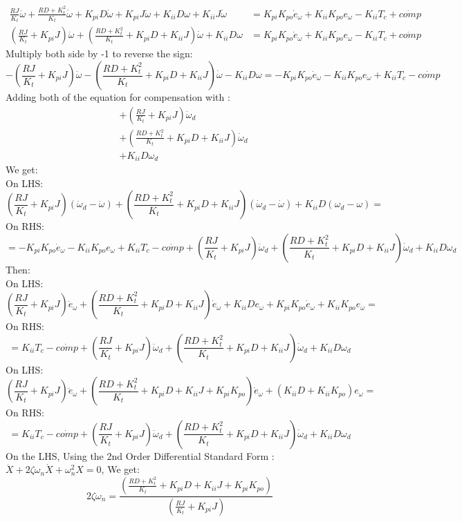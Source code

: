 	\[
	\begin{split}
		\frac{RJ}{K_t} \ddot{\omega} + \frac{RD + K_t^2}{K_t} \dot{\omega} + K_{pi}D\dot{\omega} + K_{pi}J \ddot{\omega} + K_{ii}D\omega + K_{ii}J\dot{\omega} &= K_{pi}K_{po}\dot{e}_\omega + K_{ii}K_{po}e_\omega - K_{ii}T_c  + \dot{comp} \\
		(\frac{RJ}{K_t} + K_{pi}J ) \ddot{\omega} + (\frac{RD + K_t^2}{K_t}+ K_{pi}D + K_{ii}J) \dot{\omega} + K_{ii}D\omega &=K_{pi}K_{po}\dot{e}_\omega + K_{ii}K_{po}e_\omega - K_{ii}T_c  + \dot{comp}
	\end{split}
	\]
	Multiply both side by -1 to reverse the sign:
	\[
	-(\frac{RJ}{K_t} + K_{pi}J ) \ddot{\omega} - (\frac{RD + K_t^2}{K_t}+ K_{pi}D + K_{ii}J) \dot{\omega} - K_{ii}D\omega = -K_{pi}K_{po}\dot{e}_\omega - K_{ii}K_{po}e_\omega + K_{ii}T_c  - \dot{comp}
	\]
	Adding both of the equation for compensation with :
	\[
	\begin{split}
	&+(\frac{RJ}{K_t} + K_{pi}J ) \ddot{\omega}_d \\
	&+(\frac{RD + K_t^2}{K_t}+ K_{pi}D + K_{ii}J) \dot{\omega}_d \\
	&+K_{ii}D\omega_d
	\end{split}
	\]
	We get:\\
	On LHS:
	\[
	(\frac{RJ}{K_t} + K_{pi}J ) (\ddot{\omega}_d - \ddot{\omega}) + (\frac{RD + K_t^2}{K_t}+ K_{pi}D + K_{ii}J) (\dot{\omega}_d - \dot{\omega})  + K_{ii}D(\omega_d - \omega) = 
	\]
	On RHS:
	\[
	=-K_{pi}K_{po}\dot{e}_\omega - K_{ii}K_{po}e_\omega + K_{ii}T_c  - \dot{comp} +(\frac{RJ}{K_t} + K_{pi}J ) \ddot{\omega}_d + (\frac{RD + K_t^2}{K_t}+ K_{pi}D + K_{ii}J) \dot{\omega}_d+K_{ii}D\omega_d
	\]
	Then:\\
	On LHS:
	\[
	(\frac{RJ}{K_t} + K_{pi}J ) \ddot{e}_\omega + (\frac{RD + K_t^2}{K_t}+ K_{pi}D + K_{ii}J) \dot{e}_\omega  + K_{ii}D e_\omega +K_{pi}K_{po}\dot{e}_\omega + K_{ii}K_{po}e_\omega= 
	\]
	On RHS:
	\[
	= K_{ii}T_c  - \dot{comp} +(\frac{RJ}{K_t} + K_{pi}J ) \ddot{\omega}_d + (\frac{RD + K_t^2}{K_t}+ K_{pi}D + K_{ii}J) \dot{\omega}_d+K_{ii}D\omega_d
	\]
	On LHS:
	\[
	(\frac{RJ}{K_t} + K_{pi}J ) \ddot{e}_\omega + (\frac{RD + K_t^2}{K_t}+ K_{pi}D + K_{ii}J+K_{pi}K_{po}) \dot{e}_\omega + (K_{ii}D+K_{ii}K_{po}) e_\omega = 
	\]
	On RHS:
	\[
	= K_{ii}T_c  - \dot{comp} +(\frac{RJ}{K_t} + K_{pi}J ) \ddot{\omega}_d + (\frac{RD + K_t^2}{K_t}+ K_{pi}D + K_{ii}J) \dot{\omega}_d+K_{ii}D\omega_d
	\]
	On the LHS, Using the 2nd Order Differential Standard Form : $ \ddot{X} + 2\zeta\omega_n\dot{X} + \omega_n^2 X=0 $, We get:
	\[
	2\zeta\omega_n = \frac{(\frac{RD + K_t^2}{K_t}+ K_{pi}D + K_{ii}J+K_{pi}K_{po})}{(\frac{RJ}{K_t} + K_{pi}J )}
	\]
